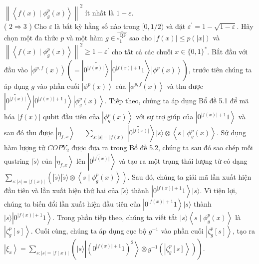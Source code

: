 \documentclass[10pt]{article}
\begin{document}
$\left\|\left\langle f(x) \mid \phi_{g}^{p}(x)\right\rangle\right\|^{2}$ ít nhất là $1-\varepsilon$.\\
( $2 \Rightarrow 3$ ) Cho $\varepsilon$ là bất kỳ hằng số nào trong $[0,1 / 2)$ và đặt $\varepsilon^{\prime}=1-\sqrt{1-\varepsilon}$. Hãy chọn một đa thức $p$ và một hàm $g \in \widehat{\square_{1}^{\mathrm{QP}}}$ sao cho $|f(x)| \leq p(|x|)$ và $\left\|\left\langle f(x) \mid \phi_{g}^{p}(x)\right\rangle\right\|^{2} \geq 1-\varepsilon^{\prime}$ cho tất cả các chuỗi $x \in\{0,1\}^{*}$. Bắt đầu với đầu vào $\left.\left|\phi^{p, f}(x)\right\rangle\left(=\left|\widetilde{\left.0^{|f(x)|}\right\rangle}\right| 0^{|f(x)|+1} 1\right\rangle\left|\phi^{p}(x)\right\rangle\right)$, trước tiên chúng ta áp dụng $g$ vào phần cuối $\left|\phi^{p}(x)\right\rangle$ của $\left|\phi^{p, f}(x)\right\rangle$ và thu được $\left|\widetilde{0^{|f(x)|}}\right\rangle\left|0^{|f(x)|+1} 1\right\rangle\left|\phi_{g}^{p}(x)\right\rangle$. Tiếp theo, chúng ta áp dụng Bổ đề 5.1 để mã hóa $|f(x)|$ qubit đầu tiên của $\left|\phi_{g}^{p}(x)\right\rangle$ với sự trợ giúp của $\left|0^{|f(x)|+1} 1\right\rangle$ và sau đó thu được $\left|\eta_{f, x}\right\rangle=\sum_{s:|s|=|f(x)|}\left|\widetilde{0^{|f(x)|}}\right\rangle|\tilde{s}\rangle \otimes\left\langle s \mid \phi_{g}^{p}(x)\right\rangle$. Sử dụng hàm lượng tử $C O P Y_{2}$ được đưa ra trong Bổ đề 5.2, chúng ta sau đó sao chép mỗi qustring $|\tilde{s}\rangle$ của $\left|\eta_{f, x}\right\rangle$ lên $\left|\widetilde{0^{|f(x)|}}\right\rangle$ và tạo ra một trạng thái lượng tử có dạng $\sum_{s:|s|=|f(x)|}\left(|\tilde{s}\rangle|\tilde{s}\rangle \otimes\left\langle s \mid \phi_{g}^{p}(x)\right\rangle\right)$. Sau đó, chúng ta giải mã lần xuất hiện đầu tiên và lần xuất hiện thứ hai của $|\tilde{s}\rangle$ thành $\left|0^{|f(x)|+1} 1\right\rangle|s\rangle$. Vì tiện lợi, chúng ta biến đổi lần xuất hiện đầu tiên của $\left|0^{|f(x)|+1} 1\right\rangle|s\rangle$ thành $|s\rangle\left|0^{|f(x)|+1} 1\right\rangle$. Trong phần tiếp theo, chúng ta viết tắt $|s\rangle\left\langle s \mid \phi_{g}^{p}(x)\right\rangle$ là $\left|\zeta_{g}^{p}[s]\right\rangle$. Cuối cùng, chúng ta áp dụng cục bộ $g^{-1}$ vào phần cuối $\left|\zeta_{g}^{p}[s]\right\rangle$, tạo ra $\left|\xi_{x}\right\rangle=\sum_{s:|s|=|f(x)|}\left(|s\rangle\left|\left(0^{|f(x)|+1} 1\right)^{2}\right\rangle \otimes g^{-1}\left(\left|\zeta_{g}^{p}[s]\right\rangle\right)\right)$.
\end{document}
